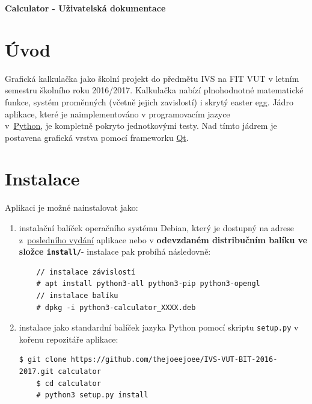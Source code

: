 \documentclass[a4paper, 11pt]{article}
\begin{document}
\thispagestyle{empty}

{\Huge{\textbf{Calculator - Uživatelská dokumentace}}}

\vspace{2cm}

\hypersetup{
    colorlinks=true,
    linktoc=all
}

{\hypersetup{linkcolor=black}
\tableofcontents
}


\newpage

\pagestyle{fancy}

\section{Úvod}\label{uvod}

Grafická kalkulačka jako školní projekt do předmětu IVS na FIT VUT v letním semestru školního roku 2016/2017. Kalkulačka nabízí plnohodnotné matematické funkce, systém proměnných (včetně jejich zavislostí) i skrytý easter egg. Jádro aplikace, které je naimplementováno v programovacím jazyce \\v~\href{https://www.python.org/}{Python}, je kompletně pokryto jednotkovými testy. Nad tímto jádrem je postavena grafická vrstva pomocí frameworku \href{https://www.qt.io/}{Qt}.



\section{Instalace}
Aplikaci je možné nainstalovat jako: \\
\begin{enumerate}
    \item instalační balíček operačního systému Debian, který je dostupný na adrese z~\href{https://github.com/thejoeejoee/IVS-VUT-BIT-2016-2017/releases/latest}{posledního vydání} aplikace nebo v \textbf{odevzdaném distribučním balíku ve složce \texttt{install/}}- instalace pak probíhá následovně: \\
    \begin{lstlisting}
    // instalace závislostí
    # apt install python3-all python3-pip python3-opengl
    // instalace balíku
    # dpkg -i python3-calculator_XXXX.deb
    \end{lstlisting}
    \item instalace jako standardní balíček jazyka Python pomocí skriptu \texttt{setup.py} v kořenu repozitáře aplikace:
    \begin{lstlisting}[breaklines]
    $ git clone https://github.com/thejoeejoee/IVS-VUT-BIT-2016-2017.git calculator
    $ cd calculator
    # python3 setup.py install
    \end{lstlisting}
\end{enumerate}
\end{document}
